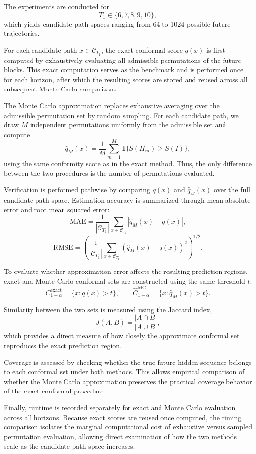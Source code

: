 \documentclass{article}
\begin{document}
The experiments are conducted for
\[
T_1 \in \{6,7,8,9,10\},
\]
which yields candidate path spaces ranging from 64 to 1024 possible future trajectories.

For each candidate path $x \in \mathcal{C}_{T_1}$, the exact conformal score $q(x)$ is first computed by exhaustively evaluating all admissible permutations of the future blocks. This exact computation serves as the benchmark and is performed once for each horizon, after which the resulting scores are stored and reused across all subsequent Monte Carlo comparisons.

The Monte Carlo approximation replaces exhaustive averaging over the admissible permutation set by random sampling. For each candidate path, we draw $M$ independent permutations uniformly from the admissible set and compute
\[
\hat q_M(x) = \frac{1}{M}\sum_{m=1}^M \mathbf{1}\{S(\Pi_m)\geq S(I)\},
\]
using the same conformity score as in the exact method. Thus, the only difference between the two procedures is the number of permutations evaluated.

Verification is performed pathwise by comparing $q(x)$ and $\hat q_M(x)$ over the full candidate path space. Estimation accuracy is summarized through mean absolute error and root mean squared error:
\[
\text{MAE} = \frac{1}{|\mathcal{C}_{T_1}|}\sum_{x\in\mathcal{C}_{T_1}} |\hat q_M(x)-q(x)|,
\]
\[
\text{RMSE} = \left(
\frac{1}{|\mathcal{C}_{T_1}|}\sum_{x\in\mathcal{C}_{T_1}} (\hat q_M(x)-q(x))^2
\right)^{1/2}.
\]

To evaluate whether approximation error affects the resulting prediction regions, exact and Monte Carlo conformal sets are constructed using the same threshold $t$:
\[
C^{\mathrm{exact}}_{1-\alpha} = \{x : q(x)>t\},
\qquad
\hat C^{\mathrm{MC}}_{1-\alpha} = \{x : \hat q_M(x)>t\}.
\]

Similarity between the two sets is measured using the Jaccard index,
\[
J(A,B)=\frac{|A\cap B|}{|A\cup B|},
\]
which provides a direct measure of how closely the approximate conformal set reproduces the exact prediction region.

Coverage is assessed by checking whether the true future hidden sequence belongs to each conformal set under both methods. This allows empirical comparison of whether the Monte Carlo approximation preserves the practical coverage behavior of the exact conformal procedure.

Finally, runtime is recorded separately for exact and Monte Carlo evaluation across all horizons. Because exact scores are reused once computed, the timing comparison isolates the marginal computational cost of exhaustive versus sampled permutation evaluation, allowing direct examination of how the two methods scale as the candidate path space increases.
\end{document}
